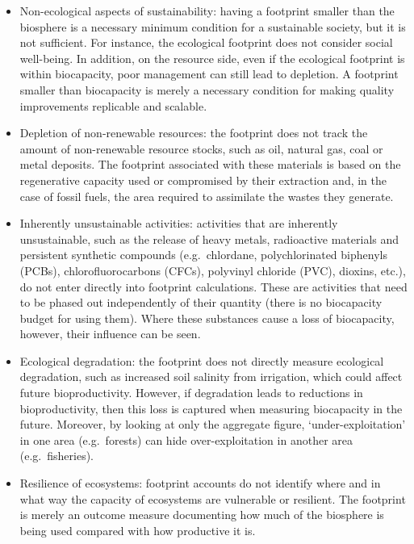 \documentclass[
  a4paper,
  openany]{book}
\begin{document}
\begin{itemize}
\item
  Non-ecological aspects of sustainability: having a footprint smaller
  than the biosphere is a necessary minimum condition for a sustainable
  society, but it is not sufficient. For instance, the ecological
  footprint does not consider social well-being. In addition, on the
  resource side, even if the ecological footprint is within biocapacity,
  poor management can still lead to depletion. A footprint smaller than
  biocapacity is merely a necessary condition for making quality
  improvements replicable and scalable.
\item
  Depletion of non-renewable resources: the footprint does not track the
  amount of non-renewable resource stocks, such as oil, natural gas,
  coal or metal deposits. The footprint associated with these materials
  is based on the regenerative capacity used or compromised by their
  extraction and, in the case of fossil fuels, the area required to
  assimilate the wastes they generate.
\item
  Inherently unsustainable activities: activities that are inherently
  unsustainable, such as the release of heavy metals, radioactive
  materials and persistent synthetic compounds (e.g.~chlordane,
  polychlorinated biphenyls (PCBs), chlorofluorocarbons (CFCs),
  polyvinyl chloride (PVC), dioxins, etc.), do not enter directly into
  footprint calculations. These are activities that need to be phased
  out independently of their quantity (there is no biocapacity budget
  for using them). Where these substances cause a loss of biocapacity,
  however, their influence can be seen.
\item
  Ecological degradation: the footprint does not directly measure
  ecological degradation, such as increased soil salinity from
  irrigation, which could affect future bioproductivity. However, if
  degradation leads to reductions in bioproductivity, then this loss is
  captured when measuring biocapacity in the future. Moreover, by
  looking at only the aggregate figure, `under-exploitation' in one area
  (e.g.~forests) can hide over-exploitation in another area
  (e.g.~fisheries).
\item
  Resilience of ecosystems: footprint accounts do not identify where and
  in what way the capacity of ecosystems are vulnerable or resilient.
  The footprint is merely an outcome measure documenting how much of the
  biosphere is being used compared with how productive it is.
\end{itemize}
\end{document}
